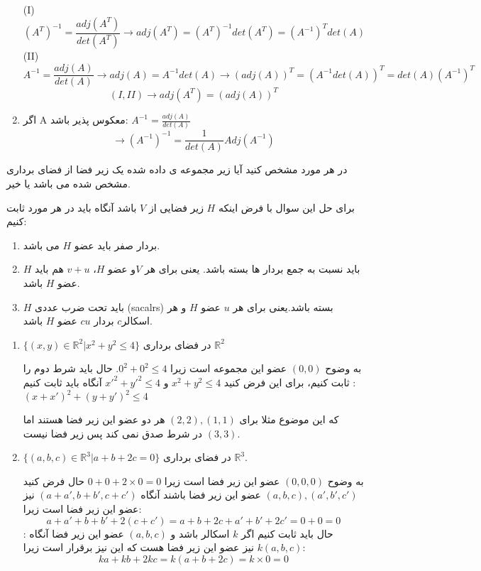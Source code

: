 \documentclass{article}
\begin{document}
\begin{enumerate}[label=\alph*)]
	(I)
	$$
	(A^T)^{-1} = \frac{adj(A^T)}{det(A^T)}  \rightarrow adj(A^T) = (A^T)^{-1} det(A^T) = (A^{-1})^T det(A)  $$
	(II)
	$$A^{-1} = \frac{adj(A)}{det(A)} \rightarrow adj(A) = A^{-1} det(A)  \rightarrow (adj(A))^T = (A^{-1} det(A))^T = det(A)(A^{-1})^T 
	$$
	$$
	(I, II)\rightarrow adj(A^T) =  (adj(A))^T
	$$
	\item 
	اگر A معکوس پذیر باشد:
	$
	A^{-1} = \frac{adj(A)}{det(A)}$
	$$\rightarrow (A^{-1})^{-1} = \frac{1}{det(A)}Adj(A^{-1})
	$$
\end{enumerate}
   

در هر مورد مشخص کنید آیا زیر مجموعه ی داده شده یک زیر فضا از فضای برداری مشخص شده می باشد یا خیر.
\begin{حل}
 برای حل این سوال با فرض اینکه  $H$ زیر فضایی از $V$ باشد آنگاه باید در هر مورد ثابت کنیم:

\begin{enumerate}[label=\arabic*),align=left,leftmargin=*]
	\item
	بردار صفر باید عضو $H$ می باشد.
	\item 
	$H$
	باید نسبت به جمع بردار ها  بسته باشد. یعنی برای هر $V$و عضو $H$،
	$v+u$
	هم باید عضو 
	$H$
	باشد.
	\item 
	$H$
باید تحت ضرب عددی (sacalrs) بسته باشد.یعنی برای هر $u$ عضو $H$ و هر اسکالر$c$ بردار $cu$ عضو $H$ باشد.	
	\end{enumerate}

\begin{enumerate}
	\item 
	$\{(x,y)\in\mathbb{R}^2|x^2+y^2 \leq4\}$
	در فضای برداری 
	$\mathbb{R}^2$
	
	
\begin{حل}
	به وضوح 
	$(0,0)$
	عضو این مجموعه است زیرا 
	$0^2+0^2\leq 4$.
	حال باید شرط دوم را ثابت کنیم، برای این فرض کنید 
	$x^2+y^2\leq4$
	و 
	$x'^2+y'^2\leq4$
	آنگاه باید ثابت کنیم :
	$(x+x')^2+(y+y')^2\leq 4$
	
	که این موضوع مثلا برای 
	$(2,2),(1,1)$
	هر دو عضو این زیر فضا هستند اما 
	$(3,3)$
	در شرط صدق نمی کند پس زیر فضا نیست.
	
	\end{حل}
	\item
	$\{(a,b,c)\in\mathbb{R}^3|a+b+2c=0  \}$
		در فضای برداری 
	$\mathbb{R}^3$.
	\begin{حل}
	
	
	به وضوح 
	$(0,0,0)$
	عضو این زیر فضا است زیرا 
	$0+0+2\times0=0$
	حال فرض کنید 
	$(a,b,c),(a',b',c')$
	عضو این زیر فضا باشند آنگاه 
	$(a+a',b+b',c+c')$
	نیز عضو این زیر فضا است زیرا: 
	$$a+a'+b+b'+2(c+c')=a+b+2c+a'+b'+2c'=0+0=0$$
	حال باید ثابت کنیم اگر
	$k$
	اسکالر باشد و 
	$(a,b,c)$
	عضو این زیر فضا آنگاه :
	$k(a,b,c)$
	نیز عضو این زیر فضا هست که این نیز برقرار است زیرا:
	$$ka+kb+2kc=k(a+b+2c)=k\times0=0$$
	\end{حل}


\end{enumerate}
\end{حل}
\end{document}
